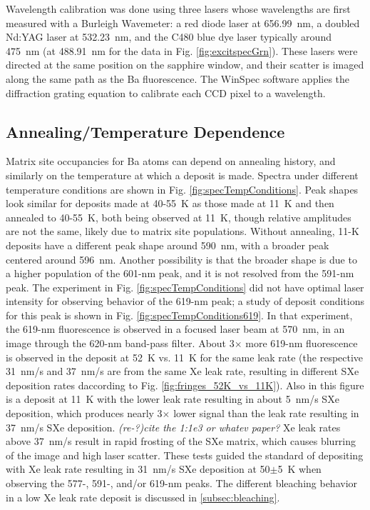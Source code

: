 Wavelength calibration was done using three lasers whose wavelengths are first measured with a Burleigh Wavemeter:  a red diode laser at 656.99~nm, a doubled Nd:YAG laser at 532.23~nm, and the C480 blue dye laser typically around 475~nm (at 488.91~nm for the data in Fig. \ref{fig:excitspecGrn}).  These lasers were directed at the same position on the sapphire window, and their scatter is imaged along the same path as the Ba fluorescence.  The WinSpec software applies the diffraction grating equation to calibrate each CCD pixel to a wavelength.

\subsection{Annealing/Temperature Dependence}
\label{subsec:tempanneal}


Matrix site occupancies for Ba atoms can depend on annealing history, and similarly on the temperature at which a deposit is made.  Spectra under different temperature conditions are shown in Fig. \ref{fig:specTempConditions}.  Peak shapes look similar for deposits made at 40-55~K as those made at 11~K and then annealed to 40-55~K, both being observed at 11~K, though relative amplitudes are not the same, likely due to matrix site populations.  Without annealing, 11-K deposits have a different peak shape around 590~nm, with a broader peak centered around 596~nm.  Another possibility is that the broader shape is due to a higher population of the 601-nm peak, and it is not resolved from the 591-nm peak.  The experiment in Fig. \ref{fig:specTempConditions} did not have optimal laser intensity for observing behavior of the 619-nm peak; a study of deposit conditions for this peak is shown in Fig. \ref{fig:specTempConditions619}.  In that experiment, the 619-nm fluorescence is observed in a focused laser beam at 570~nm, in an image through the 620-nm band-pass filter.  About 3$\times$ more 619-nm fluorescence is observed in the deposit at 52~K vs. 11~K for the same leak rate (the respective 31~nm/s and 37~nm/s are from the same Xe leak rate, resulting in different SXe deposition rates daccording to Fig. \ref{fig:fringes_52K_vs_11K}).  Also in this figure is a deposit at 11~K with the lower leak rate resulting in about 5~nm/s SXe deposition, which produces nearly 3$\times$ lower signal than the leak rate resulting in 37~nm/s SXe deposition.  \emph{\color{gray}(re-?)cite the 1:1e3 or whatev paper?}  Xe leak rates above 37~nm/s result in rapid frosting of the SXe matrix, which causes blurring of the image and high laser scatter.  These tests guided the standard of depositing with Xe leak rate resulting in 31~nm/s SXe deposition at 50$\pm$5~K when observing the 577-, 591-, and/or 619-nm peaks.  The different bleaching behavior in a low Xe leak rate deposit is discussed in \ref{subsec:bleaching}.

